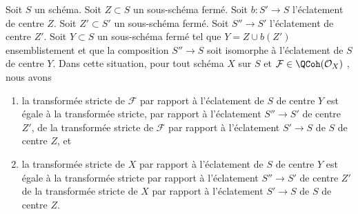\begin{lemma}
\label{lemma-strict-transform-composition-blowups}
Soit  $S$  un schéma. Soit  $Z \subset S$  un sous-schéma fermé. Soit
 $b : S' \to S$  l'éclatement de centre  $Z$. Soit  $Z' \subset S'$  un
sous-schéma fermé. Soit  $S'' \to S'$  l'éclatement de centre  $Z'$.
Soit  $Y \subset S$  un sous-schéma fermé tel que  $Y = Z \cup b(Z')$
ensemblistement et que la composition  $S'' \to S$  soit isomorphe à l'éclatement
de  $S$  de centre  $Y$. Dans cette situation, pour tout schéma
 $X$  sur  $S$  et  $\mathcal{F} \in \QCoh(\mathcal{O}_X)$ , nous avons
\begin{enumerate}
\item la transformée stricte de  $\mathcal{F}$  par rapport à l'éclatement de
 $S$  de centre  $Y$  est égale à la transformée stricte, par rapport à
l'éclatement  $S'' \to S'$  de centre  $Z'$, de la transformée stricte de
 $\mathcal{F}$  par rapport à l'éclatement  $S' \to S$  de  $S$  de centre
 $Z$, et
\item la transformée stricte de  $X$  par rapport à l'éclatement de  $S$  de centre
 $Y$  est égale à la transformée stricte par rapport à l'éclatement
 $S'' \to S'$  de centre  $Z'$  de la transformée stricte de  $X$  par
rapport à l'éclatement  $S' \to S$  de  $S$  de centre  $Z$.
\end{enumerate}
\end{lemma}

